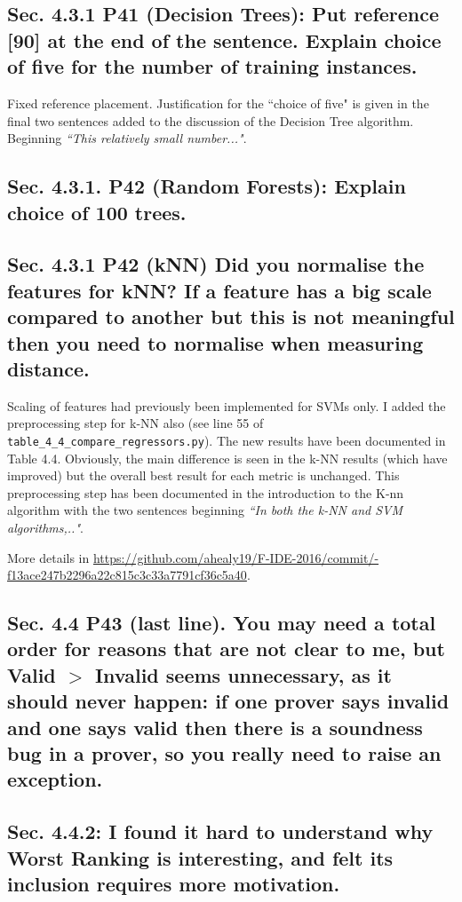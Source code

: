 \documentclass[]{article}
\begin{document}
\subsection{Sec. 4.3.1 P41 (Decision Trees): Put reference [90] at the end of the sentence. Explain choice of five for the number of training instances.}

Fixed reference placement. Justification for the ``choice of five" is given in the final two sentences added to the discussion of the Decision Tree algorithm. Beginning \emph{``This relatively small number..."}. 

\subsection{Sec. 4.3.1. P42 (Random Forests): Explain choice of 100 trees.} 
	
\subsection{Sec. 4.3.1 P42 (kNN) Did you normalise the features for kNN? If a feature has a big scale compared to another but this is not meaningful then you need to normalise when measuring distance.}

Scaling of features had previously been implemented for SVMs only. I added the preprocessing step for k-NN also (see line 55 of \texttt{table\_4\_4\_compare\_regressors.py}). 
The new results have been documented in Table 4.4. 
Obviously, the main difference is seen in the k-NN results (which have improved) but the overall best result for each metric is unchanged.
This preprocessing step has been documented in the introduction to the K-nn algorithm with the two sentences beginning \emph{``In both the k-NN and SVM algorithms,.."}. 

\sloppypar
More details in \url{https://github.com/ahealy19/F-IDE-2016/commit/-f13ace247b2296a22c815c3c33a7791cf36c5a40}.

\subsection{Sec. 4.4 P43 (last line). You may need a total order for reasons that are not clear to me, but Valid $>$ Invalid seems unnecessary, as it should never happen: if one prover says invalid and one says valid then there is a soundness bug in a prover, so you really need to raise an exception.}

\subsection{Sec. 4.4.2: I found it hard to understand why Worst Ranking is interesting, and felt its inclusion requires more motivation.}
\end{document}
